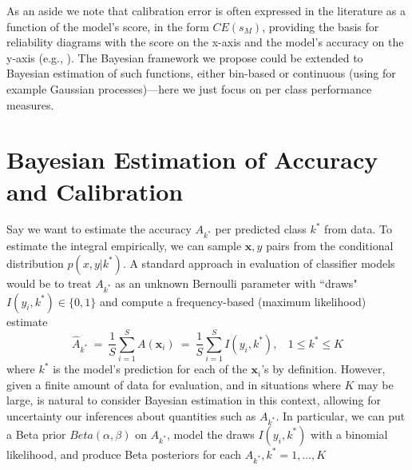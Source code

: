 \documentclass{article}
\newcommand{\ux}{{\mathbf{x}}}
\begin{document}
As an aside we note that calibration error is often expressed in the literature as a function of the model's score, in the form $CE(s_M)$, providing the basis for reliability diagrams with the score on the x-axis and the model's accuracy on the y-axis (e.g., \cite{guo2017calibration}).
The Bayesian framework we propose could be extended to Bayesian estimation of such functions, either bin-based or continuous (using for example Gaussian processes)---here we just focus on per class performance measures.


\section{Bayesian Estimation of Accuracy and Calibration}\label{sec:bayesian}
Say we want to estimate the accuracy ${A}_{k^*}$ per predicted class $k^*$ from data. To estimate the integral empirically, we can sample $\ux,y$ pairs from the conditional distribution $p(x,y | k^*)$.
A standard approach in evaluation of classifier models would be to treat ${A}_{k^*}$ as an unknown Bernoulli parameter with ``draws" $I(y_i, k^*) \in \{0,1\}$ and compute a frequency-based (maximum likelihood) estimate
\[
\hat{A}_{k^*} \ = \  \frac{1}{S} \sum_{i=1}^S A(\ux_i)
 \ = \ \frac{1}{S} \sum_{i=1}^S I(y_i, k^*), \ \ \ \ 1 \le k^* \le K
\]
where $k^*$ is the model's prediction for each of the $\ux_i$'s by definition.
However, given a finite amount of data for evaluation, and in situations where $K$ may be large, is natural to consider Bayesian estimation in this context, allowing for  uncertainty our inferences about quantities such as ${A}_{k^*}$.
In particular, we can put a Beta prior $Beta(\alpha, \beta)$ on ${A}_{k^*}$, model the draws $I(y_i, k^*)$ with a binomial likelihood, and produce Beta posteriors for each ${A}_{k^*}, k^* = 1,\ldots,K$
\end{document}
